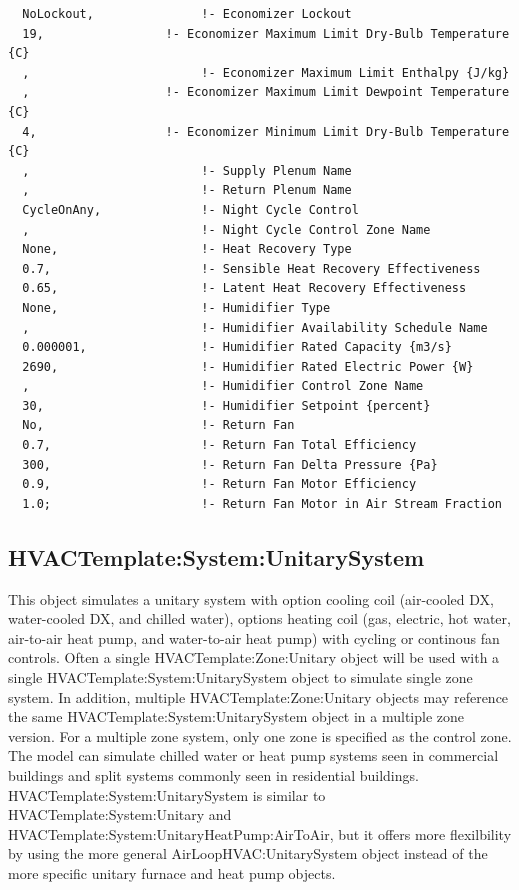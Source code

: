 \begin{lstlisting}
  NoLockout,               !- Economizer Lockout
  19,                 !- Economizer Maximum Limit Dry-Bulb Temperature {C}
  ,                        !- Economizer Maximum Limit Enthalpy {J/kg}
  ,                   !- Economizer Maximum Limit Dewpoint Temperature {C}
  4,                  !- Economizer Minimum Limit Dry-Bulb Temperature {C}
  ,                        !- Supply Plenum Name
  ,                        !- Return Plenum Name
  CycleOnAny,              !- Night Cycle Control
  ,                        !- Night Cycle Control Zone Name
  None,                    !- Heat Recovery Type
  0.7,                     !- Sensible Heat Recovery Effectiveness
  0.65,                    !- Latent Heat Recovery Effectiveness
  None,                    !- Humidifier Type
  ,                        !- Humidifier Availability Schedule Name
  0.000001,                !- Humidifier Rated Capacity {m3/s}
  2690,                    !- Humidifier Rated Electric Power {W}
  ,                        !- Humidifier Control Zone Name
  30,                      !- Humidifier Setpoint {percent}
  No,                      !- Return Fan
  0.7,                     !- Return Fan Total Efficiency
  300,                     !- Return Fan Delta Pressure {Pa}
  0.9,                     !- Return Fan Motor Efficiency
  1.0;                     !- Return Fan Motor in Air Stream Fraction
\end{lstlisting}

\subsection{HVACTemplate:System:UnitarySystem}\label{hvactemplatesystemunitarysystem}

This object simulates a unitary system with option cooling coil (air-cooled DX, water-cooled DX, and chilled water), options heating coil (gas, electric, hot water, air-to-air heat pump, and water-to-air heat pump) with cycling or continous fan controls. Often a single HVACTemplate:Zone:Unitary object will be used with a single HVACTemplate:System:UnitarySystem object to simulate single zone system. In addition, multiple HVACTemplate:Zone:Unitary objects may reference the same HVACTemplate:System:UnitarySystem object in a multiple zone version. For a multiple zone system, only one zone is specified as the control zone. The model can simulate chilled water or heat pump systems seen in commercial buildings and split systems commonly seen in residential buildings. HVACTemplate:System:UnitarySystem is similar to HVACTemplate:System:Unitary and HVACTemplate:System:UnitaryHeatPump:AirToAir, but it offers more flexilbility by using the more general AirLoopHVAC:UnitarySystem object instead of the more specific unitary furnace and heat pump objects.

